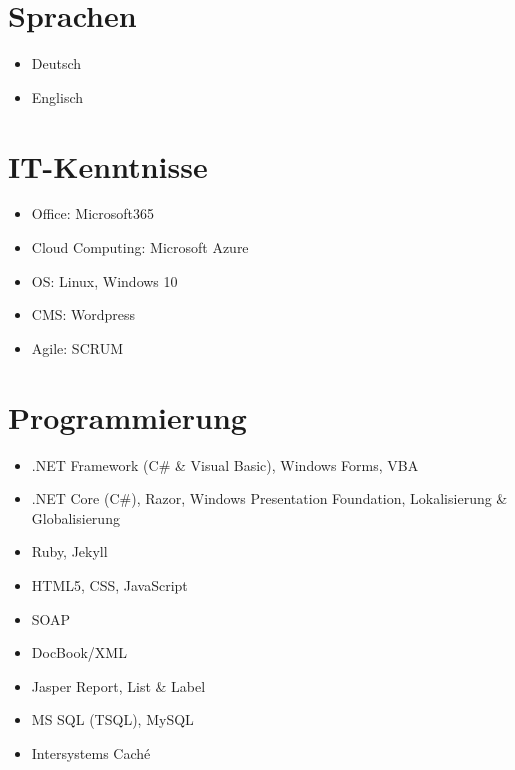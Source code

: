 \documentclass[a4paper]{friggeri-cv} %
\begin{document}

\section{Sprachen}
\begin{itemize}
	\item Deutsch 
	\item Englisch 
\end{itemize}

\section{IT-Kenntnisse}
\begin {itemize}
	\item Office: Microsoft365 
  \item Cloud Computing: Microsoft Azure
	\item OS: Linux, Windows 10
	\item CMS: Wordpress 
	\item Agile: SCRUM 
\end{itemize}

\section{Programmierung}
\begin{itemize}
	\item .NET Framework (C\# \& Visual Basic), Windows Forms, VBA
	\item .NET Core (C\#), Razor, Windows Presentation Foundation, Lokalisierung \& Globalisierung	
	\item Ruby, Jekyll
	\item HTML5, CSS, JavaScript 
	\item SOAP 
	\item DocBook/XML
	\item Jasper Report, List \& Label
	\item MS SQL (TSQL), MySQL 
	\item Intersystems Caché
\end{itemize}
\end{document}
